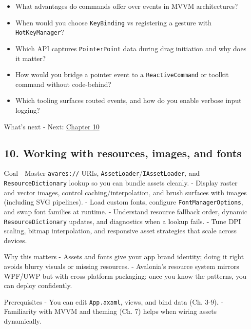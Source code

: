 \begin{itemize}
\tightlist
\item
  What advantages do commands offer over events in MVVM architectures?
\item
  When would you choose \passthrough{\lstinline!KeyBinding!} vs
  registering a gesture with \passthrough{\lstinline!HotKeyManager!}?
\item
  Which API captures \passthrough{\lstinline!PointerPoint!} data during
  drag initiation and why does it matter?
\item
  How would you bridge a pointer event to a
  \passthrough{\lstinline!ReactiveCommand!} or toolkit command without
  code-behind?
\item
  Which tooling surfaces routed events, and how do you enable verbose
  input logging?
\end{itemize}

What's next - Next: \href{Chapter10.md}{Chapter 10}

\newpage

\subsection{10. Working with resources, images, and
fonts}\label{working-with-resources-images-and-fonts}

Goal - Master \passthrough{\lstinline!avares://!} URIs,
\passthrough{\lstinline!AssetLoader!}/\passthrough{\lstinline!IAssetLoader!},
and \passthrough{\lstinline!ResourceDictionary!} lookup so you can
bundle assets cleanly. - Display raster and vector images, control
caching/interpolation, and brush surfaces with images (including SVG
pipelines). - Load custom fonts, configure
\passthrough{\lstinline!FontManagerOptions!}, and swap font families at
runtime. - Understand resource fallback order, dynamic
\passthrough{\lstinline!ResourceDictionary!} updates, and diagnostics
when a lookup fails. - Tune DPI scaling, bitmap interpolation, and
responsive asset strategies that scale across devices.

Why this matters - Assets and fonts give your app brand identity; doing
it right avoids blurry visuals or missing resources. - Avalonia's
resource system mirrors WPF/UWP but with cross-platform packaging; once
you know the patterns, you can deploy confidently.

Prerequisites - You can edit \passthrough{\lstinline!App.axaml!}, views,
and bind data (Ch. 3-9). - Familiarity with MVVM and theming (Ch. 7)
helps when wiring assets dynamically.

